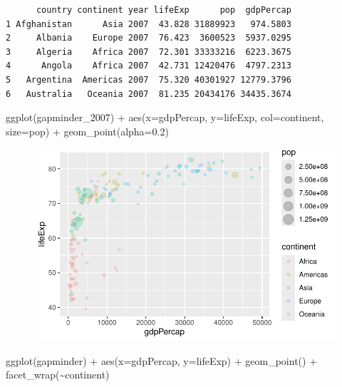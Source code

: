 \documentclass[
  letterpaper,
  DIV=11,
  numbers=noendperiod]{scrartcl}
\newenvironment{Shaded}{\begin{snugshade}}{\end{snugshade}}
\newcommand{\AttributeTok}[1]{\textcolor[rgb]{0.40,0.45,0.13}{#1}}
\newcommand{\FloatTok}[1]{\textcolor[rgb]{0.68,0.00,0.00}{#1}}
\newcommand{\FunctionTok}[1]{\textcolor[rgb]{0.28,0.35,0.67}{#1}}
\newcommand{\NormalTok}[1]{\textcolor[rgb]{0.00,0.23,0.31}{#1}}
\newcommand{\SpecialCharTok}[1]{\textcolor[rgb]{0.37,0.37,0.37}{#1}}
\begin{document}
\begin{verbatim}
      country continent year lifeExp      pop  gdpPercap
1 Afghanistan      Asia 2007  43.828 31889923   974.5803
2     Albania    Europe 2007  76.423  3600523  5937.0295
3     Algeria    Africa 2007  72.301 33333216  6223.3675
4      Angola    Africa 2007  42.731 12420476  4797.2313
5   Argentina  Americas 2007  75.320 40301927 12779.3796
6   Australia   Oceania 2007  81.235 20434176 34435.3674
\end{verbatim}

\begin{Shaded}
\begin{Highlighting}[]
\FunctionTok{ggplot}\NormalTok{(gapminder\_2007) }\SpecialCharTok{+} \FunctionTok{aes}\NormalTok{(}\AttributeTok{x=}\NormalTok{gdpPercap, }\AttributeTok{y=}\NormalTok{lifeExp, }\AttributeTok{col=}\NormalTok{continent, }\AttributeTok{size=}\NormalTok{pop) }\SpecialCharTok{+} \FunctionTok{geom\_point}\NormalTok{(}\AttributeTok{alpha=}\FloatTok{0.2}\NormalTok{)}
\end{Highlighting}
\end{Shaded}

\begin{figure}[H]

{\centering \includegraphics{./-class05_files/figure-pdf/unnamed-chunk-26-1.pdf}

}

\end{figure}

\begin{Shaded}
\begin{Highlighting}[]
\FunctionTok{ggplot}\NormalTok{(gapminder) }\SpecialCharTok{+} \FunctionTok{aes}\NormalTok{(}\AttributeTok{x=}\NormalTok{gdpPercap, }\AttributeTok{y=}\NormalTok{lifeExp) }\SpecialCharTok{+} \FunctionTok{geom\_point}\NormalTok{() }\SpecialCharTok{+} \FunctionTok{facet\_wrap}\NormalTok{(}\SpecialCharTok{\textasciitilde{}}\NormalTok{continent)}
\end{Highlighting}
\end{Shaded}
\end{document}
